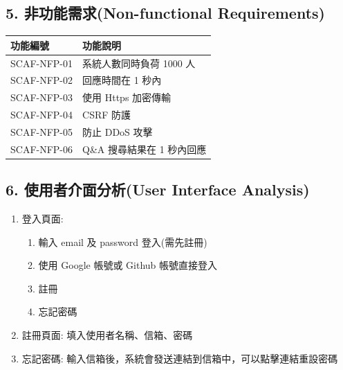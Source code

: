 \documentclass{report}
\begin{document}
\subsection*{5. 非功能需求(Non-functional Requirements)}

\begin{tabularx}{\textwidth}{
  |p{}%
  |p{}|%
}
  \hline
  功能編號 &  功能說明 \\ \hline
  SCAF-NFP-01 & 系統人數同時負荷 1000 人 \\ \hline
  SCAF-NFP-02 & 回應時間在 1 秒內 \\ \hline
  SCAF-NFP-03 & 使用 Https 加密傳輸 \\ \hline
  SCAF-NFP-04 & CSRF 防護 \\ \hline
  SCAF-NFP-05 & 防止 DDoS 攻擊 \\ \hline
  SCAF-NFP-06 & Q\&A 搜尋結果在 1 秒內回應 \\ \hline
\end{tabularx}

\subsection*{6. 使用者介面分析(User Interface Analysis)}
\begin{enumerate}
  \item 登入頁面:
    \begin{enumerate}
      \item 輸入 email 及 password 登入(需先註冊)
      \item 使用 Google 帳號或 Github 帳號直接登入
      \item 註冊
      \item 忘記密碼
    \end{enumerate}
  \item 註冊頁面: 填入使用者名稱、信箱、密碼
  \item 忘記密碼: 輸入信箱後，系統會發送連結到信箱中，可以點擊連結重設密碼
\end{enumerate}
\end{document}
